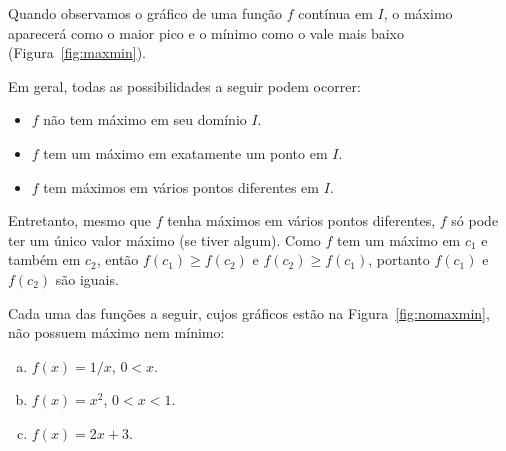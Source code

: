 Quando observamos o gráfico de uma função $f$ contínua em $I$, o máximo
aparecerá como o maior pico e o mínimo como o vale mais baixo
(Figura~\ref{fig:maxmin}).


Em geral, todas as possibilidades a seguir podem ocorrer:
\begin{itemize}
\item $f$ não tem máximo em seu domínio $I$.
\item $f$ tem um máximo em exatamente um ponto em $I$.
\item $f$ tem máximos em vários pontos diferentes em $I$.
\end{itemize}

Entretanto, mesmo que $f$ tenha máximos em vários pontos diferentes, $f$ só
pode ter um único valor máximo (se tiver algum). Como $f$ tem um máximo em
$c_1$ e também em $c_2$, então $f(c_1) \ge f(c_2)$ e $f(c_2) \ge f(c_1)$,
portanto $f(c_1)$ e $f(c_2)$ são iguais.

\begin{example}
  Cada uma das funções a seguir, cujos gráficos estão na
  Figura~\ref{fig:nomaxmin}, não possuem máximo nem mínimo:
  \begin{enumerate}[(a)]
  \item $f(x) = 1/x$, \hspace{1.5em} $0 < x$.
  \item $f(x) = x^2$, \hspace{1.5em} $0 < x < 1$.
  \item $f(x) = 2x + 3$.
  \end{enumerate}
\end{example}

